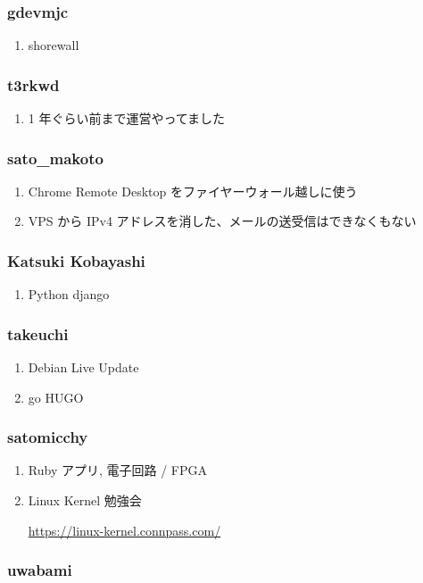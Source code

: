 \documentclass[cjk,dvipdfmx,10pt,compress,%
hyperref={bookmarks=true,bookmarksnumbered=true,bookmarksopen=false,%
colorlinks=false,%
pdftitle={第 132 回 関西 Debian 勉強会},%
pdfauthor={かわだ},%
pdfsubject={資料},%
}]{beamer}
\begin{document}
\begin{frame}
  \frametitle{ gdevmjc }
  \begin{enumerate}
  \item shorewall
  \end{enumerate}
\end{frame}

\begin{frame}
  \frametitle{ t3rkwd }
  \begin{enumerate}
  \item 1 年ぐらい前まで運営やってました
  \end{enumerate}
\end{frame}

\begin{frame}
  \frametitle{ sato\_makoto }
  \begin{enumerate}
  \item Chrome Remote Desktop をファイヤーウォール越しに使う
  \item VPS から IPv4 アドレスを消した、メールの送受信はできなくもない
  \end{enumerate}
\end{frame}

\begin{frame}
  \frametitle{ Katsuki Kobayashi }
  \begin{enumerate}
  \item Python django
  \end{enumerate}
\end{frame}

\begin{frame}
  \frametitle{ takeuchi }
  \begin{enumerate}
  \item Debian Live Update
  \item go HUGO
  \end{enumerate}
\end{frame}

\begin{frame}
  \frametitle{ satomicchy }
  \begin{enumerate}
  \item Ruby アプリ, 電子回路 / FPGA
  \item Linux Kernel 勉強会

    \url{https://linux-kernel.connpass.com/}
  \end{enumerate}
\end{frame}

\begin{frame}
  \frametitle{ uwabami }
\end{frame}
\end{document}

